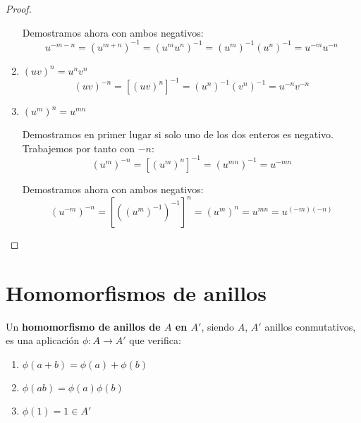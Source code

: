 \begin{proof}
\begin{enumerate}
        Demostramos ahora con ambos negativos:
        \begin{equation*}
            u^{-m-n} = (u^{m+n})^{-1} = (u^mu^n)^{-1} = (u^m)^{-1}(u^n)^{-1} = u^{-m}u^{-n}
        \end{equation*}        
        
        \item $(uv)^n = u^nv^n$
        \begin{equation*}
            (uv)^{-n} = [(uv)^n]^{-1} = (u^n)^{-1}(v^n)^{-1} = u^{-n}v^{-n}
        \end{equation*}
        
        \item $(u^m)^n = u^{mn}$

        Demostramos en primer lugar si solo uno de los dos enteros es negativo. Trabajemos por tanto con $-n$:
        \begin{equation*}
            (u^m)^{-n} = [(u^m)^n]^{-1} = (u^{mn})^{-1} = u^{-mn}
        \end{equation*}

        Demostramos ahora con ambos negativos:
        \begin{equation*}
            (u^{-m})^{-n} = [((u^m)^{-1})^{-1}]^n = (u^m)^n = u^{mn} = u^{(-m)(-n)}
        \end{equation*}
    \end{enumerate}
\end{proof}


\section{Homomorfismos de anillos}
\begin{definicion}[Homomorfismo]
    Un \textbf{homomorfismo de anillos de $A$ en $A'$}, siendo $A$, $A'$ anillos conmutativos, es una aplicación
    $\phi:A \longrightarrow A'$ que verifica:
    \begin{enumerate}
        \item $\phi(a+b) = \phi(a) + \phi(b)$
        \item $\phi(ab) = \phi(a)\phi(b)$
        \item $\phi(1) = 1 \in A'$
    \end{enumerate}
\end{definicion}

